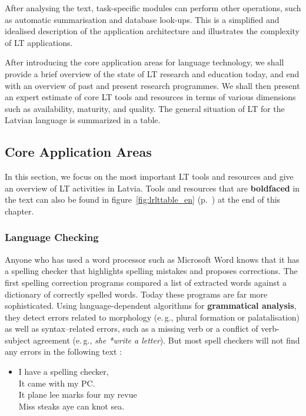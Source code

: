 \begin{multicols}{2}
After analysing the text, task-specific modules can perform other operations, such as automatic summarisation and database look-ups.  This is a simplified and idealised description of the application architecture and illustrates the complexity of LT applications.

After introducing the core application areas for language technology, we shall provide a brief overview of the state of LT research and education today, and end with an overview of past and present research programmes.
We shall then present an expert estimate of core LT tools and resources in terms of various dimensions such as availability, maturity, and quality.
The general situation of LT for the Latvian language is summarized in a table.

\subsection{Core Application Areas}

In this section, we focus on the most important LT tools and resources and give an overview of LT activities in Latvia.  Tools and resources that are \textbf{boldfaced} in the text can also be found in figure~\ref{fig:lrlttable_en} (p.~\pageref{fig:lrlttable_en}) at the end of this chapter.

\subsubsection{Language Checking}

Anyone who has used a word processor such as Microsoft Word knows that it has a spelling checker that highlights spelling mistakes and proposes corrections.  The first spelling correction programs compared a list of extracted words against a dictionary of correctly spelled words.  Today these programs are far more sophisticated.  Using language-dependent algorithms for \textbf{grammatical analysis}, they detect errors related to morphology (e.\,g., plural formation or palatalisation) as well as syntax--related errors, such as a missing verb or a conflict of verb-subject agreement (e.\,g., \textit{she *write a letter}).  But most spell checkers will not find any errors in the following text \cite{Meta15}:

\begin{itemize}
\item[] I have a spelling checker,\\
  It came with my PC.\\
  It plane lee marks four my revue\\
  Miss steaks aye can knot sea. 
\end{itemize}


\end{multicols}
